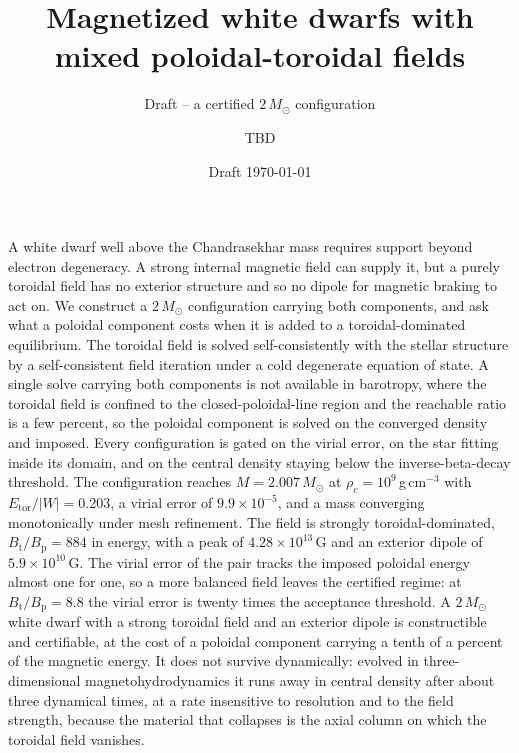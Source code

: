 \documentclass{aa}
\begin{document}
   \title{Magnetized white dwarfs with mixed poloidal-toroidal fields}

   \subtitle{Draft -- a certified $2\,M_\odot$ configuration}

   \author{TBD
          }


   \date{Draft \today}

   \abstract
   {A white dwarf well above the Chandrasekhar mass requires support
    beyond electron degeneracy. A strong internal magnetic field can
    supply it, but a purely toroidal field has no exterior structure and
    so no dipole for magnetic braking to act on.}
   {We construct a $2\,M_\odot$ configuration carrying both components,
    and ask what a poloidal component costs when it is added to a
    toroidal-dominated equilibrium.}
   {The toroidal field is solved self-consistently with the stellar
    structure by a self-consistent field iteration under a cold
    degenerate equation of state. A single solve carrying both components
    is not available in barotropy, where the toroidal field is confined to
    the closed-poloidal-line region and the reachable ratio is a few
    percent, so the poloidal component is solved on the converged density
    and imposed. Every configuration is gated on the virial error, on the
    star fitting inside its domain, and on the central density staying
    below the inverse-beta-decay threshold.}
   {The configuration reaches $M = 2.007\,M_\odot$ at
    $\rho_c = 10^9$\,g\,cm$^{-3}$ with $E_{\mathrm{tor}}/|W| = 0.203$,
    a virial error of $9.9\times10^{-5}$, and a mass converging
    monotonically under mesh refinement. The field is strongly
    toroidal-dominated, $B_{\mathrm{t}}/B_{\mathrm{p}} = 884$ in energy,
    with a peak of $4.28\times10^{13}$\,G and an exterior dipole of
    $5.9\times10^{10}$\,G. The virial error of the pair tracks the
    imposed poloidal energy almost one for one, so a more balanced field
    leaves the certified regime: at
    $B_{\mathrm{t}}/B_{\mathrm{p}} = 8.8$ the virial error is twenty
    times the acceptance threshold.}
   {A $2\,M_\odot$ white dwarf with a strong toroidal field and an
    exterior dipole is constructible and certifiable, at the cost of a
    poloidal component carrying a tenth of a percent of the magnetic
    energy. It does not survive dynamically: evolved in three-dimensional
    magnetohydrodynamics it runs away in central density after about three
    dynamical times, at a rate insensitive to resolution and to the field
    strength, because the material that collapses is the axial column on
    which the toroidal field vanishes.}
\end{document}
